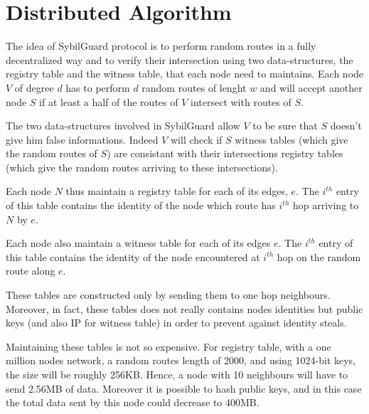 \documentclass[a4paper,11pt]{article}
\begin{document}
\section{Distributed Algorithm}


The idea of SybilGuard protocol is to perform random routes in a fully decentralized way and to verify their intersection using two data-structures, the registry table and the witness table, that each node need to maintains.
Each node $V$ of degree $d$ has to perform $d$ random routes of lenght $w$ and will accept another node $S$ if at least a half of the routes of $V$ intersect with routes of $S$.  


The two data-structures involved in SybilGuard allow $V$ to be sure that $S$ doesn't give him false informations.
Indeed $V$ will check if $S$ witness tables (which give the random routes of $S$) are consistant with their intersections registry tables (which give the random routes arriving to these intersections).

Each node $N$ thus maintain a registry table for each of its edges, $e$. 
The $i^{th}$ entry of this table contains the identity of the node which route has $i^{th}$ hop arriving to $N$ by $e$.

Each node also maintain a witness table for each of its edges $e$.
The $i^{th}$ entry of this table contains the identity of the node encountered at $i^{th}$ hop on the random route along $e$.

These tables are constructed only by sending them to one hop neighbours.
Moreover, in fact, these tables does not really contains nodes identities but public keys (and also IP for witness table) in order to prevent against identity steals.

Maintaining these tables is not so expensive.
For registry table, with a one million nodes network, a random routes length of 2000, and using 1024-bit keys, the size will be roughly 256KB.
Hence, a node with 10 neighbours will have to send 2.56MB of data.
Moreover it is possible to hash public keys, and in this case the total data sent by this node could decrease to 400MB.

\end{document}
